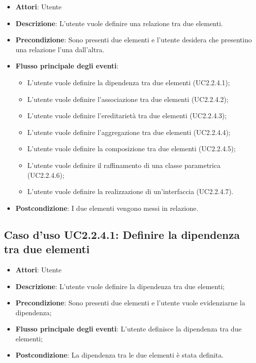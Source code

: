 \documentclass[../AnalisiDeiRequisiti.tex]{subfiles}
\begin{document}
	\begin{itemize}
		\item \textbf{Attori}: Utente
		\item \textbf{Descrizione}: L'utente vuole definire una relazione tra due elementi.
		\item \textbf{Precondizione}: Sono presenti due elementi e l'utente desidera che presentino una relazione l'una dall'altra.
		\item \textbf{Flusso principale degli eventi}: \begin{itemize}
			\item L'utente vuole definire la dipendenza tra due elementi (UC2.2.4.1);
			\item L'utente vuole definire l'associazione tra due elementi (UC2.2.4.2);
			\item L'utente vuole definire l'ereditarietà tra due elementi (UC2.2.4.3);
			\item L'utente vuole definire l'aggregazione tra due elementi (UC2.2.4.4);
			\item L'utente vuole definire la composizione tra due elementi (UC2.2.4.5);
			\item L'utente vuole definire il raffinamento di una classe parametrica (UC2.2.4.6);
			\item L'utente vuole definire la realizzazione di un'interfaccia (UC2.2.4.7).
			\end{itemize}
				\item \textbf{Postcondizione}: I due elementi vengono messi in relazione.
			\end{itemize}
			\subsection{Caso d'uso UC2.2.4.1: Definire la dipendenza tra due elementi}
			\begin{itemize}
				\item \textbf{Attori}: Utente
				\item \textbf{Descrizione}: L'utente vuole definire la dipendenza tra due elementi;
				\item \textbf{Precondizione}: Sono presenti due elementi e l'utente vuole evidenziarne la dipendenza;
				\item \textbf{Flusso principale degli eventi}: L'utente definisce la dipendenza tra due elementi;
				\item \textbf{Postcondizione}: La dipendenza tra le due elementi è stata definita.
			\end{itemize}
\end{document}
